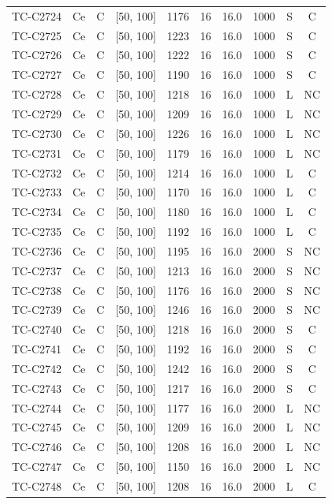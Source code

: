 \begin{longtable}{lccccccccc}
TC-C2724 & Ce & C & [50, 100] & 1176 & 16 & 16.0 & 1000 & S & C \\
TC-C2725 & Ce & C & [50, 100] & 1223 & 16 & 16.0 & 1000 & S & C \\
TC-C2726 & Ce & C & [50, 100] & 1222 & 16 & 16.0 & 1000 & S & C \\
TC-C2727 & Ce & C & [50, 100] & 1190 & 16 & 16.0 & 1000 & S & C \\
TC-C2728 & Ce & C & [50, 100] & 1218 & 16 & 16.0 & 1000 & L & NC \\
TC-C2729 & Ce & C & [50, 100] & 1209 & 16 & 16.0 & 1000 & L & NC \\
TC-C2730 & Ce & C & [50, 100] & 1226 & 16 & 16.0 & 1000 & L & NC \\
TC-C2731 & Ce & C & [50, 100] & 1179 & 16 & 16.0 & 1000 & L & NC \\
TC-C2732 & Ce & C & [50, 100] & 1214 & 16 & 16.0 & 1000 & L & C \\
TC-C2733 & Ce & C & [50, 100] & 1170 & 16 & 16.0 & 1000 & L & C \\
TC-C2734 & Ce & C & [50, 100] & 1180 & 16 & 16.0 & 1000 & L & C \\
TC-C2735 & Ce & C & [50, 100] & 1192 & 16 & 16.0 & 1000 & L & C \\
TC-C2736 & Ce & C & [50, 100] & 1195 & 16 & 16.0 & 2000 & S & NC \\
TC-C2737 & Ce & C & [50, 100] & 1213 & 16 & 16.0 & 2000 & S & NC \\
TC-C2738 & Ce & C & [50, 100] & 1176 & 16 & 16.0 & 2000 & S & NC \\
TC-C2739 & Ce & C & [50, 100] & 1246 & 16 & 16.0 & 2000 & S & NC \\
TC-C2740 & Ce & C & [50, 100] & 1218 & 16 & 16.0 & 2000 & S & C \\
TC-C2741 & Ce & C & [50, 100] & 1192 & 16 & 16.0 & 2000 & S & C \\
TC-C2742 & Ce & C & [50, 100] & 1242 & 16 & 16.0 & 2000 & S & C \\
TC-C2743 & Ce & C & [50, 100] & 1217 & 16 & 16.0 & 2000 & S & C \\
TC-C2744 & Ce & C & [50, 100] & 1177 & 16 & 16.0 & 2000 & L & NC \\
TC-C2745 & Ce & C & [50, 100] & 1209 & 16 & 16.0 & 2000 & L & NC \\
TC-C2746 & Ce & C & [50, 100] & 1208 & 16 & 16.0 & 2000 & L & NC \\
TC-C2747 & Ce & C & [50, 100] & 1150 & 16 & 16.0 & 2000 & L & NC \\
TC-C2748 & Ce & C & [50, 100] & 1208 & 16 & 16.0 & 2000 & L & C \\

\end{longtable}
